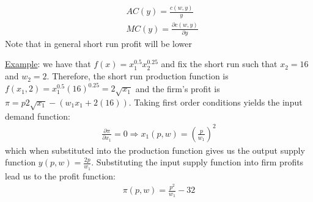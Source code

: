 \documentclass{article}
\begin{document}
  \begin{align*}
    & AC(y) = \frac{c(w,y)}{y} \\
    & MC(y) = \frac{\partial c(w,y)}{\partial y}
  \end{align*}
  Note that in general short run profit will be lower
  \par
  \underline{Example}: we have that $f(x) = x_{1}^{0.5}x_{2}^{0.25}$ and fix the short run such that $x_{2} = 16$ and $w_{2} = 2$. Therefore, the short run production function is $f(x_{1},2) = x_{1}^{0.5}(16)^{0.25} = 2 \sqrt{x_{1}}$ and the firm's profit is $\pi = p2\sqrt{x_{1}} - (w_{1}x_{1} + 2(16))$. Taking first order conditions yields the input demand function:
  \begin{gather*}
    \frac{\partial \pi}{\partial x_{1}} = 0 \Rightarrow x_{1}(p,w) = (\frac{p}{w_{1}})^{2}
  \end{gather*}
  which when substituted into the production function gives us the output supply function $y(p,w) = \tfrac{2p}{w_{1}}$. Substituting the input supply function into firm profits lead us to the profit function:
  \begin{gather*}
    \pi(p,w) = \frac{p^{2}}{w_{1}} - 32
  \end{gather*}
\end{document}
